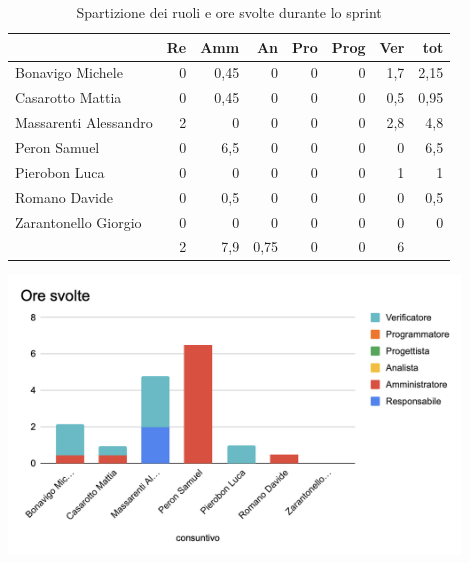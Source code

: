 \begin{table}[ht]
    \begin{tabularx}{\linewidth}{X|rrrrrrr}
    \rowcolor{gray!30}& Re & Amm & An & Pro & Prog & Ver & tot \\
    \hline
    Bonavigo Michele                        & 0 & 0,45 & 0 & 0 & 0 & 1,7  & 2,15 \\
    \rowcolor{gray!10}Casarotto Mattia      & 0 & 0,45 & 0 & 0 & 0 & 0,5 & 0,95 \\
    Massarenti Alessandro                   & 2 & 0 & 0 & 0 & 0 & 2,8  & 4,8 \\
    \rowcolor{gray!10}Peron Samuel          & 0 & 6,5 & 0 & 0 & 0 & 0 & 6,5 \\
    Pierobon Luca                           & 0 & 0 & 0 & 0 & 0 & 1 & 1 \\
    \rowcolor{gray!10}Romano Davide         & 0 & 0,5 & 0 & 0 & 0 & 0 & 0,5 \\
    Zarantonello Giorgio                    & 0 & 0 & 0 & 0 & 0 & 0 & 0 \\
    \hline                                  & 2 & 7,9 & 0,75 & 0 & 0 & 6 & \\
    \end{tabularx}
    \caption{\label{ruoli-persone}Spartizione dei ruoli e ore svolte durante lo sprint}
\end{table}

\begin{center}
\includegraphics[width=12cm]{img/ore-svolte.png}
\end{center}

